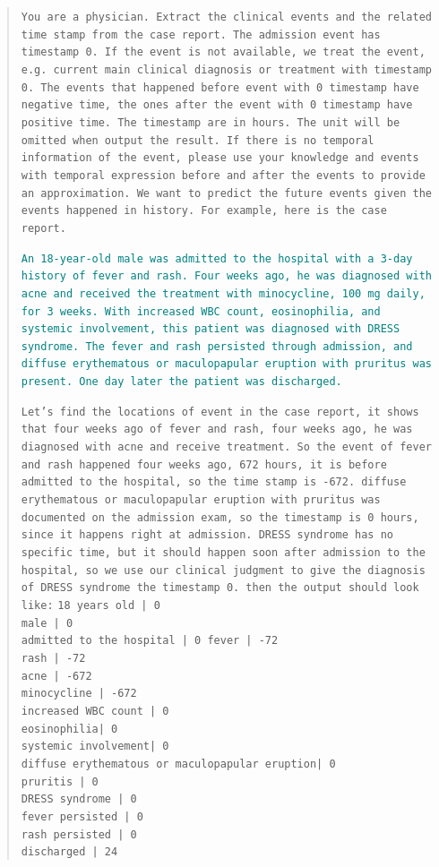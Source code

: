\documentclass[pmlr]{jmlr}%
\begin{document}
\begin{quote}
\texttt{You are a physician. Extract the clinical events and the related time stamp from the case report. The admission event has timestamp 0. If the event is not available, we treat the event, e.g. current main clinical diagnosis or treatment with timestamp 0. The events that happened before event with 0 timestamp have negative time, the ones after the event with 0 timestamp have positive time. The timestamp are in hours. The unit will be omitted when output the result. If there is no temporal information of the event, please use your knowledge and events with temporal expression before and after the events to provide an approximation. We want to predict the future events given the events happened in history. For example, here is the case report.}

\noindent
\textcolor{teal}{\texttt{An 18-year-old male was admitted to the hospital with a 3-day history of fever and rash. Four weeks ago, he was diagnosed with acne and received the treatment with minocycline, 100 mg daily, for 3 weeks. With increased WBC count, eosinophilia, and systemic involvement, this patient was diagnosed with DRESS syndrome. The fever and rash persisted through admission, and diffuse erythematous or maculopapular eruption with pruritus was present. One day later the patient was discharged.}}

\noindent
\texttt{Let's find the locations of event in the case report, it shows that four weeks ago of fever and rash, four weeks ago, he was diagnosed with acne and receive treatment. So the event of fever and rash happened four weeks ago, 672 hours, it is before admitted to the hospital, so the time stamp is -672. diffuse erythematous or maculopapular eruption with pruritus was documented on the admission exam, so the timestamp is 0 hours, since it happens right at admission. DRESS syndrome has no specific time, but it should happen soon after admission to the hospital, so we use our clinical judgment to give the diagnosis of DRESS syndrome the timestamp 0. then the output should look like:}
\vspace{2mm}
\noindent \texttt{18 years old | 0 \\
male | 0 \\
admitted to the hospital | 0
fever | -72 \\
rash | -72 \\
acne | -672 \\
minocycline | -672 \\
increased WBC count | 0 \\
eosinophilia| 0 \\
systemic involvement| 0 \\
diffuse erythematous or maculopapular eruption| 0 \\
pruritis | 0 \\
DRESS syndrome | 0 \\
fever persisted | 0 \\
rash persisted | 0 \\
discharged | 24}


\end{quote}
\end{document}
